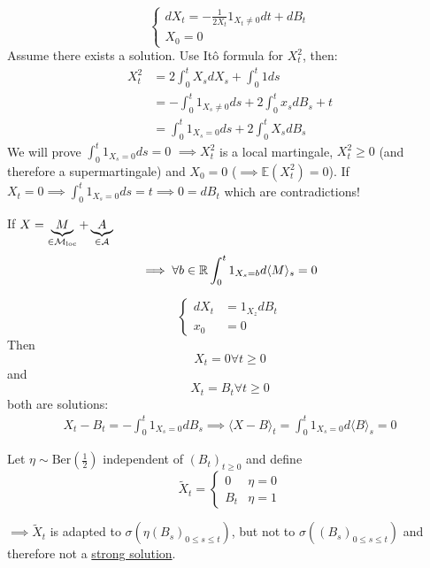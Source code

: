 \begin{example}[No solutions]\label{ex:1.8}
    \begin{equation}
        \begin{cases}
            dX_t=-\frac{1}{2X_t}1_{X_t\neq 0}dt+dB_t\\
            X_0=0
        \end{cases}        
    \end{equation}
    Assume there exists a solution. Use Itô formula for $X_t^2$, then:
    \begin{align*}
        X_t^2&=2\int_0^t X_s dX_s +\int_0^t 1 ds\\
        &=-\int_0^t 1_{X_s\neq 0}ds +2\int_0^t x_s dB_s+t\\
        &=\int_0^t 1_{X_s=0}ds+2\int_0^t X_s dB_s
    \end{align*}
    We will prove $\int_0^t 1_{X_s=0}ds=0$ $\implies X_t^2$ is a local martingale, $X_t^2\geq 0$ (and therefore a supermartingale) and $X_0=0$ ($\implies \mathbb{E}(X_t^2)=0$). 
    If $X_t=0\implies \int_0^t 1_{X_s=0}ds=t\implies 0=dB_t$ which are contradictions!
\end{example}

\begin{remark}
    If $X=\underbrace{M}_{\in\mathcal{M}_{\text{loc}}}+\underbrace{A}_{\in\mathcal{A}}$
    \[\implies \forall b\in \mathbb{R}\int_0^t 1_{X_s=b}d \langle M\rangle_s=0\]
\end{remark}




\begin{example}
    \[\begin{cases}
        dX_t &= 1_{X_z}dB_t\\
        x_0&=0
    \end{cases}\]
    Then \[X_t=0\forall t\geq 0\] and
    \[X_t=B_t\forall t\geq 0\] 
    both are solutions:
    \begin{align*}
        X_t-B_t=-\int_{0}^t1_{X_s=0}dB_s\implies \langle X-B\rangle_t =\int_0^t 1_{X_s=0}d\langle B\rangle_s=0
    \end{align*}

    Let $\eta\sim\text{Ber}\left(\frac{1}{2}\right)$ independent of $(B_t)_{t\geq 0}$
    and define 
    \[\tilde{X}_t=\begin{cases}
        0 & \eta=0\\
        B_t & \eta=1
    \end{cases}\]

    $\implies \tilde{X}_t$ is adapted to $\sigma(\eta(B_s)_{0\leq s\leq t})$, but not to $\sigma((B_s)_{0\leq s\leq t})$ and therefore not a 
    \hyperref[def:strong_solution]{strong solution}.

\end{example}

